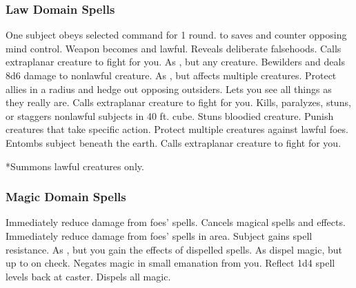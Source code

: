 \subsubsection{Law Domain Spells}

\begin{spelllist}
   One subject obeys selected command for 1 round.
    to saves and counter opposing mind control.
   Weapon becomes  and lawful.
  \spellhead[2]{}
   Reveals deliberate falsehoods.
   Calls extraplanar creature to fight for you.
   As , but any creature.
   Bewilders and deals 8d6 damage to nonlawful creature.
   As , but affects multiple creatures.
   Protect allies in a \areamed radius and hedge out opposing outsiders.
  \M Lets you see all things as they really are.
   Calls extraplanar creature to fight for you.
   Kills, paralyzes, stuns, or staggers nonlawful subjects in 40 ft. cube.
   Stuns bloodied creature.
   Punish creatures that take specific action.
  \F Protect multiple creatures against lawful foes.
   Entombs subject beneath the earth.
   Calls extraplanar creature to fight for you.
\end{spelllist}
*Summons lawful creatures only.

\subsubsection{Magic Domain Spells}

\begin{spelllist}
   Immediately reduce damage from foes' spells.
  \spellhead[1]{}
  \spellhead[2]{}
  \spellhead[2]{}
   Cancels magical spells and effects.
   Immediately reduce damage from foes' spells in area.
  \spellhead[4]{}
   Subject gains spell resistance.
  \spellhead[5]{}
   As , but you gain the effects of dispelled spells.
  \spellhead[6]{}
   As dispel magic, but up to  on check.
   Negates magic in small emanation from you.
   Reflect 1d4 spell levels back at caster.
  \spellhead[8]{}
  \spellhead[8]{}
   Dispels all magic.
  \spellhead[9]{}
\end{spelllist}

